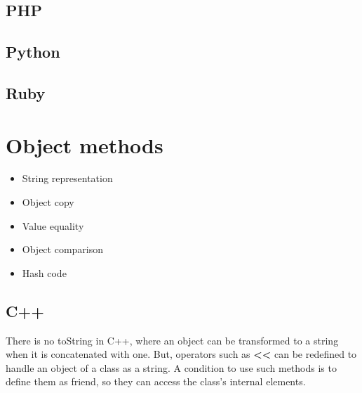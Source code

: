 \documentclass{KodeBook}
\begin{document}
\subsection{PHP}







\subsection{Python}



\subsection{Ruby}








\section{Object methods}

\begin{itemize}
	\item String representation
	\item Object copy
	\item Value equality
	\item Object comparison
	\item Hash code
\end{itemize}


\subsection{C++}

There is no toString in C++, where an object can be transformed to a string when it is concatenated with one. 
But, operators such as \textbf{<<} can be redefined to handle an object of a class as a string. 
A condition to use such methods is to define them as friend, so they can access the class's internal elements.  
\end{document}
